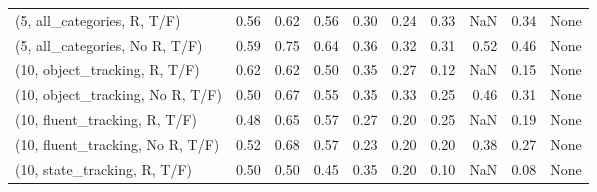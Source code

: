 \begin{table*}[h!]
\begin{adjustbox}{width=2\columnwidth,center}
\begin{tabular}{lrrr|rrr|rrr}
(5, all\_categories, R, T/F)          &                      0.56 &                  0.62 &                      0.56 &                          0.30 &                      0.24 &                          0.33 &                                    NaN &                               0.34 &                                  None \\
(5, all\_categories, No R, T/F)       &                      0.59 &                  0.75 &                      0.64 &                          0.36 &                      0.32 &                          0.31 &                                   0.52 &                               0.46 &                                  None \\



\midrule
(10, object\_tracking, R, T/F)         &                      0.62 &                  0.62 &                      0.50 &                          0.35 &                      0.27 &                          0.12 &                                    NaN &                               0.15 &                                  None \\
(10, object\_tracking, No R, T/F)      &                      0.50 &                  0.67 &                      0.55 &                          0.35 &                      0.33 &                          0.25 &                                   0.46 &                               0.31 &                                  None \\
(10, fluent\_tracking, R, T/F)         &                      0.48 &                  0.65 &                      0.57 &                          0.27 &                      0.20 &                          0.25 &                                    NaN &                               0.19 &                                  None \\
(10, fluent\_tracking, No R, T/F)      &                      0.52 &                  0.68 &                      0.57 &                          0.23 &                      0.20 &                          0.20 &                                   0.38 &                               0.27 &                                  None \\
(10, state\_tracking, R, T/F)          &                      0.50 &                  0.50 &                      0.45 &                          0.35 &                      0.20 &                          0.10 &                                    NaN &                               0.08 &                                  None \\

\end{tabular}
\end{adjustbox}
\end{table*}
